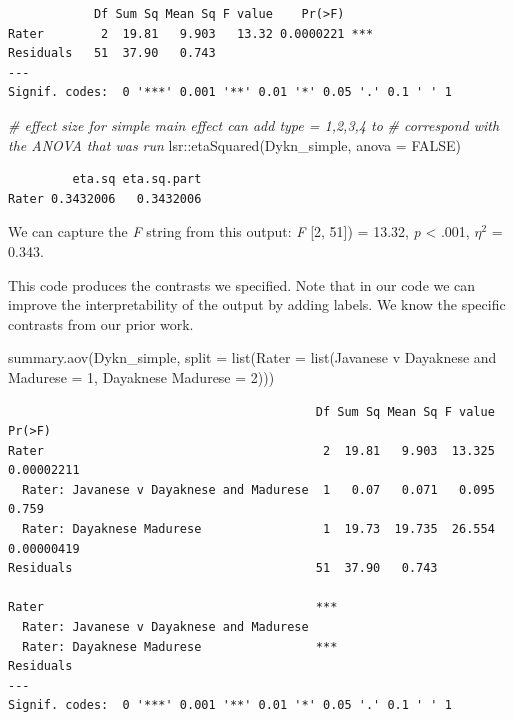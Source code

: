 \documentclass[
  11pt,
]{book}
\newenvironment{Shaded}{\begin{snugshade}}{\end{snugshade}}
\newcommand{\AttributeTok}[1]{\textcolor[rgb]{0.77,0.63,0.00}{#1}}
\newcommand{\CommentTok}[1]{\textcolor[rgb]{0.56,0.35,0.01}{\textit{#1}}}
\newcommand{\ConstantTok}[1]{\textcolor[rgb]{0.00,0.00,0.00}{#1}}
\newcommand{\DecValTok}[1]{\textcolor[rgb]{0.00,0.00,0.81}{#1}}
\newcommand{\FunctionTok}[1]{\textcolor[rgb]{0.00,0.00,0.00}{#1}}
\newcommand{\NormalTok}[1]{#1}
\newcommand{\OtherTok}[1]{\textcolor[rgb]{0.56,0.35,0.01}{#1}}
\newcommand{\SpecialCharTok}[1]{\textcolor[rgb]{0.00,0.00,0.00}{#1}}
\newcommand{\StringTok}[1]{\textcolor[rgb]{0.31,0.60,0.02}{#1}}
\begin{document}
\begin{verbatim}
            Df Sum Sq Mean Sq F value    Pr(>F)    
Rater        2  19.81   9.903   13.32 0.0000221 ***
Residuals   51  37.90   0.743                      
---
Signif. codes:  0 '***' 0.001 '**' 0.01 '*' 0.05 '.' 0.1 ' ' 1
\end{verbatim}

\begin{Shaded}
\begin{Highlighting}[]
\CommentTok{\# effect size for simple main effect can add \textquotesingle{}type = 1,2,3,4\textquotesingle{} to}
\CommentTok{\# correspond with the ANOVA that was run}
\NormalTok{lsr}\SpecialCharTok{::}\FunctionTok{etaSquared}\NormalTok{(Dykn\_simple, }\AttributeTok{anova =} \ConstantTok{FALSE}\NormalTok{)}
\end{Highlighting}
\end{Shaded}

\begin{verbatim}
         eta.sq eta.sq.part
Rater 0.3432006   0.3432006
\end{verbatim}

We can capture the \emph{F} string from this output: \emph{F} {[}2, 51{]}) = 13.32, \emph{p} \textless{} .001, \(\eta ^{2}\) = 0.343.

This code produces the contrasts we specified. Note that in our code we can improve the interpretability of the output by adding labels. We know the specific contrasts from our prior work.

\begin{Shaded}
\begin{Highlighting}[]
\FunctionTok{summary.aov}\NormalTok{(Dykn\_simple, }\AttributeTok{split =} \FunctionTok{list}\NormalTok{(}\AttributeTok{Rater =} \FunctionTok{list}\NormalTok{(}\StringTok{\textasciigrave{}}\AttributeTok{Javanese v Dayaknese and Madurese}\StringTok{\textasciigrave{}} \OtherTok{=} \DecValTok{1}\NormalTok{,}
    \StringTok{\textasciigrave{}}\AttributeTok{Dayaknese Madurese}\StringTok{\textasciigrave{}} \OtherTok{=} \DecValTok{2}\NormalTok{)))}
\end{Highlighting}
\end{Shaded}

\begin{verbatim}
                                           Df Sum Sq Mean Sq F value     Pr(>F)
Rater                                       2  19.81   9.903  13.325 0.00002211
  Rater: Javanese v Dayaknese and Madurese  1   0.07   0.071   0.095      0.759
  Rater: Dayaknese Madurese                 1  19.73  19.735  26.554 0.00000419
Residuals                                  51  37.90   0.743                   
                                              
Rater                                      ***
  Rater: Javanese v Dayaknese and Madurese    
  Rater: Dayaknese Madurese                ***
Residuals                                     
---
Signif. codes:  0 '***' 0.001 '**' 0.01 '*' 0.05 '.' 0.1 ' ' 1
\end{verbatim}
\end{document}
